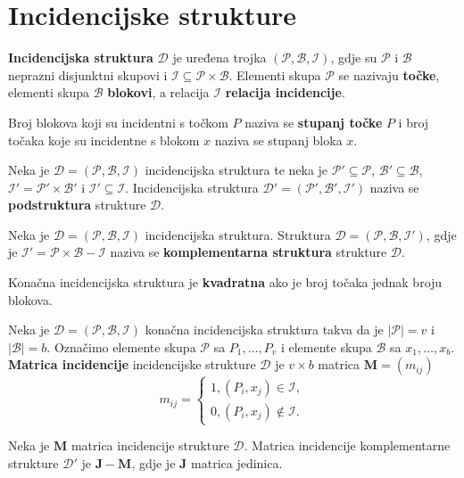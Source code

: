 \section{Incidencijske strukture}

\textbf{Incidencijska struktura} $\mathcal{D}$ je uređena trojka
$(\mathcal{P}, \mathcal{B}, \mathcal{I})$, gdje su
$\mathcal{P}$ i $\mathcal{B}$ neprazni disjunktni skupovi i
$\mathcal{I} \subseteq \mathcal{P} \times \mathcal{B}$.
Elementi skupa $\mathcal{P}$ se nazivaju \textbf{točke}, elementi skupa
$\mathcal{B}$ \textbf{blokovi}, a relacija $\mathcal{I}$
\textbf{relacija incidencije}.

Broj blokova koji su incidentni s točkom $P$ naziva se \textbf{stupanj točke}
$P$ i broj točaka koje su incidentne s blokom $x$ naziva se  stupanj bloka $x$.

\bigskip
\noindent
Neka je $\mathcal{D} = (\mathcal{P}, \mathcal{B}, \mathcal{I})$ incidencijska
struktura te neka je $\mathcal{P}' \subseteq \mathcal{P}$,
$\mathcal{B}' \subseteq \mathcal{B}$,
$\mathcal{I}' = \mathcal{P}' \times \mathcal{B}'$ i
$\mathcal{I}' \subseteq \mathcal{I}$. Incidencijska struktura
$\mathcal{D}' = (\mathcal{P}', \mathcal{B}', \mathcal{I}')$ naziva se
\textbf{podstruktura} strukture $\mathcal{D}$.

\smallskip
\noindent
Neka je $\mathcal{D} = (\mathcal{P}, \mathcal{B}, \mathcal{I})$ incidencijska
struktura. Struktura $\mathcal{D} = (\mathcal{P}, \mathcal{B}, \mathcal{I}')$,
gdje je $\mathcal{I}' = \mathcal{P} \times \mathcal{B} - \mathcal{I}$ naziva se
\textbf{komplementarna struktura} strukture $\mathcal{D}$.

\smallskip
\noindent
Konačna incidencijska struktura je \textbf{kvadratna} ako je broj točaka jednak
broju blokova.

\bigskip
\noindent
Neka je $\mathcal{D} = (\mathcal{P}, \mathcal{B}, \mathcal{I})$ konačna
incidencijska struktura takva da je $|\mathcal{P}| = v$ i $|\mathcal{B}| = b$.
Označimo elemente skupa $\mathcal{P}$ sa $P_1, \dots, P_v$ i elemente skupa
$\mathcal{B}$ sa $x_1, \dots, x_b$. \textbf{Matrica incidencije} incidencijske
strukture $\mathcal{D}$ je $v \times b$ matrica $\mathbf{M} = (m_{ij})$
$$
m_{ij} = \begin{cases*}
    1, (P_i, x_j) \in \mathcal{I},\\
    0, (P_i, x_j) \notin \mathcal{I}.
\end{cases*}
$$

\noindent
Neka je $\mathbf{M}$ matrica incidencije strukture $\mathcal{D}$. Matrica
incidencije komplementarne strukture $\mathcal{D}'$ je
$\mathbf{J} - \mathbf{M}$, gdje je $\mathbf{J}$ matrica jedinica.

